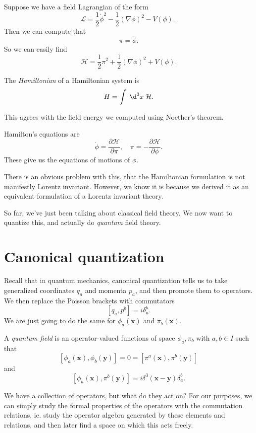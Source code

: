\documentclass[a4paper]{article}
\begin{document}
\begin{eg}
  Suppose we have a field Lagrangian of the form
  \[
    \mathcal{L} = \frac{1}{2} \dot{\phi}^2 - \frac{1}{2} (\nabla \phi)^2 - V(\phi)..
  \]
  Then we can compute that
  \[
    \pi = \dot\phi.
  \]
  So we can easily find
  \[
    \mathcal{H} = \frac{1}{2}\pi^2 + \frac{1}{2}(\nabla \phi)^2 + V(\phi).
  \]
\end{eg}

\begin{defi}[Hamiltonian]
  The \emph{Hamiltonian} of a Hamiltonian system is
  \[
    H = \int\;\d^3 x\; \mathcal{H}.
  \]
\end{defi}
This agrees with the field energy we computed using Noether's theorem.

\begin{defi}
  Hamilton's equations are
  \[
    \dot{\phi} = \frac{\partial \mathcal{H}}{\partial \pi},\quad \dot{\pi} = -\frac{\partial \mathcal{H}}{\partial \phi}.
  \]
  These give us the equations of motions of $\phi$.
\end{defi}
There is an obvious problem with this, that the Hamiltonian formulation is not manifestly Lorentz invariant. However, we know it is because we derived it as an equivalent formulation of a Lorentz invariant theory.

So far, we've just been talking about classical field theory. We now want to quantize this, and actually do \emph{quantum} field theory.

\section{Canonical quantization}
Recall that in quantum mechanics, canonical quantization tells us to take generalized coordinates $q_a$ and momenta $p_a$, and then promote them to operators. We then replace the Poisson brackets with commutators
\[
  [q_a, p^b] = i \delta_a^b.
\]
We are just going to do the same for $\phi_a(\mathbf{x})$ and $\pi_b(\mathbf{x})$.

\begin{defi}
  A \emph{quantum field} is an operator-valued functions of space $\phi_a, \pi_b$ with $a, b \in I$ such that
  \[
    [\phi_a(\mathbf{x}), \phi_b(\mathbf{y})] = 0 = [\pi^a(\mathbf{x}), \pi^b(\mathbf{y})]
  \]
  and
  \[
    [\phi_a(\mathbf{x}), \pi^b(\mathbf{y})] = i \delta^3(\mathbf{x} - \mathbf{y}) \delta_a^b.
  \]
\end{defi}
\begin{own}
  We have a collection of operators, but what do they act on? For our purposes, we can simply study the formal properties of the operators with the commutation relations, ie. study the operator algebra generated by these elements and relations, and then later find a space on which this acts freely.
\end{own}
\end{document}
